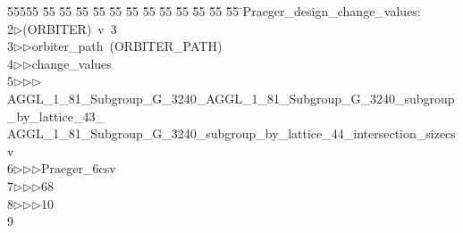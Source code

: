%
%
\begin{tabbing}
55555 \= 55 \= 55 \= 55 \= 55 \= 55 \= 55 \= 55 \= 55 \= 55 \= 55 \= 55 \= 55 \= \>Praeger\_design\_change\_values:\\[0pt]
2\>$\triangleright$\>(ORBITER)\ v\ 3\ \\[0pt]
3\>$\triangleright$\>$\triangleright$\>orbiter\_path\ (ORBITER\_PATH)\ \\[0pt]
4\>$\triangleright$\>$\triangleright$\>change\_values\ \\[0pt]
5\>$\triangleright$\>$\triangleright$\>$\triangleright$\>AGGL\_1\_81\_Subgroup\_G\_3240\_AGGL\_1\_81\_Subgroup\_G\_3240\_subgroup\_by\_lattice\_43\_\\[0pt]
\>AGGL\_1\_81\_Subgroup\_G\_3240\_subgroup\_by\_lattice\_44\_intersection\_sizecsv\ \\[0pt]
6\>$\triangleright$\>$\triangleright$\>$\triangleright$\>Praeger\_6csv\ \\[0pt]
7\>$\triangleright$\>$\triangleright$\>$\triangleright$68\ \\[0pt]
8\>$\triangleright$\>$\triangleright$\>$\triangleright$10\\[0pt]
9\>\end{tabbing}
